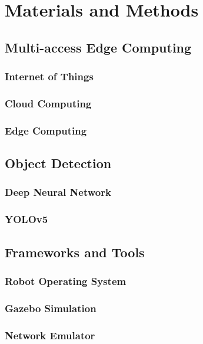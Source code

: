 \chapter{Materials and Methods}\label{ch:methods_and_material}

\section{Multi-access Edge Computing}\label{sec:methods_and_material:mec}

\subsection{Internet of Things}

\subsection{Cloud Computing}

\subsection{Edge Computing}

\section{Object Detection}\label{sec:methods_and_material:object_detection}

\subsection{Deep Neural Network}

\subsection{YOLOv5}

\section{Frameworks and Tools}\label{sec:methods_and_material:frameworks_and_tools}

\subsection{Robot Operating System}

\subsection{Gazebo Simulation}

\subsection{Network Emulator}
